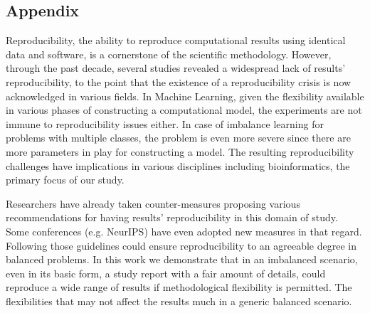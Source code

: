 \begin{appendix}
    \section{Appendix}
    Reproducibility, the ability to reproduce computational results using identical data and software, 
    is a cornerstone of the scientific methodology. However, through the past decade, several studies 
    revealed a widespread lack of results’ reproducibility, to the point that the existence of a 
    reproducibility crisis is now acknowledged in various fields.
    In Machine Learning, given the flexibility available in various phases of constructing a 
    computational model, the experiments are not immune to reproducibility issues either. 
    In case of imbalance learning for problems with multiple classes, the problem is even more 
    severe since there are more parameters in play for constructing a model. 
    The resulting reproducibility challenges have implications in various disciplines 
    including bioinformatics, the primary focus of our study.
    
    
    Researchers have already taken counter-measures proposing various recommendations for having results’ 
    reproducibility in this domain of study. Some conferences (e.g. NeurIPS) have even adopted 
    new measures in that regard. Following those guidelines could ensure reproducibility  
    to an agreeable degree in balanced problems.
    In this work we demonstrate that in an imbalanced scenario, even in its basic form, 
    a study report with a fair amount of details, could reproduce a wide range of results if 
    methodological flexibility is permitted. The flexibilities that may not affect the results 
    much in a generic balanced scenario. 
\end{appendix}